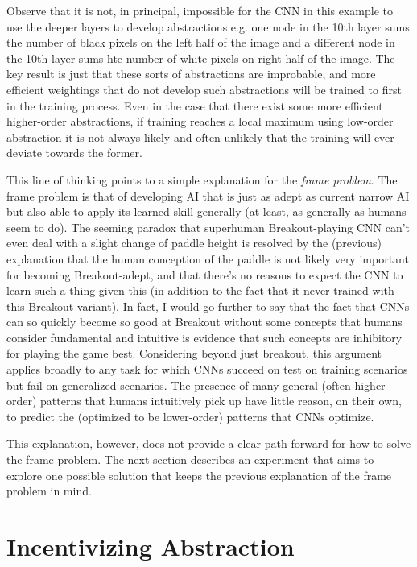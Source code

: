 \documentclass{article}
\renewcommand{\it}{\textit}
\begin{document}
Observe that it is not, in principal, impossible for the CNN in this example to use the deeper layers to develop abstractions e.g. one node in the 10th layer sums the number of black pixels on the left half of the image and a different node in the 10th layer sums hte number of white pixels on right half of the image.
The key result is just that these sorts of abstractions are improbable, and more efficient weightings that do not develop such abstractions will be trained to first in the training process.
Even in the case that there exist some more efficient higher-order abstractions, if training reaches a local maximum using low-order abstraction it is not always likely and often unlikely that the training will ever deviate towards the former.


This line of thinking points to a simple explanation for the \it{frame problem}.
The frame problem is that of developing AI that is just as adept as current narrow AI but also able to apply its learned skill generally (at least, as generally as humans seem to do).
The seeming paradox that superhuman Breakout-playing CNN can't even deal with a slight change of paddle height is resolved by the (previous) explanation that the human conception of the paddle is not likely very important for becoming Breakout-adept, and that there's no reasons to expect the CNN to learn such a thing given this (in addition to the fact that it never trained with this Breakout variant).
In fact, I would go further to say that the fact that CNNs can so quickly become so good at Breakout without some concepts that humans consider fundamental and intuitive is evidence that such concepts are inhibitory for playing the game best.
Considering beyond just breakout, this argument applies broadly to any task for which CNNs succeed on test on training scenarios but fail on generalized scenarios.
The presence of many general (often higher-order) patterns that humans intuitively pick up have little reason, on their own, to predict the (optimized to be lower-order) patterns that CNNs optimize.

This explanation, however, does not provide a clear path forward for how to solve the frame problem.
The next section describes an experiment that aims to explore one possible solution that keeps the previous explanation of the frame problem in mind.

\section{Incentivizing Abstraction}
\end{document}
